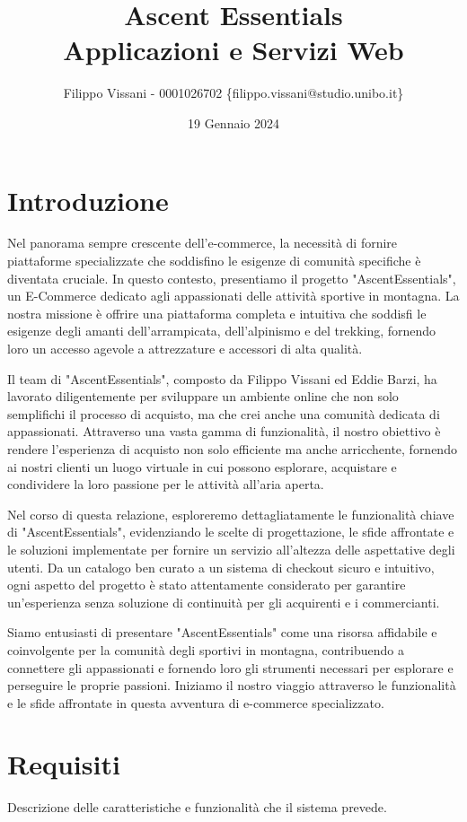 \documentclass[12pt,a4paper,openright,twoside]{book}
\title{
    Ascent Essentials \\
    \large Applicazioni e Servizi Web
}
\author{Filippo Vissani - 0001026702 \{filippo.vissani@studio.unibo.it\}}
\date{19 Gennaio 2024}
\begin{document}
\maketitle
\chapter{Introduzione}
Nel panorama sempre crescente dell'e-commerce, la necessità di fornire piattaforme specializzate che soddisfino le esigenze di comunità specifiche è diventata cruciale. In questo contesto, presentiamo il progetto "AscentEssentials", un E-Commerce dedicato agli appassionati delle attività sportive in montagna. La nostra missione è offrire una piattaforma completa e intuitiva che soddisfi le esigenze degli amanti dell'arrampicata, dell'alpinismo e del trekking, fornendo loro un accesso agevole a attrezzature e accessori di alta qualità.

Il team di "AscentEssentials", composto da Filippo Vissani ed Eddie Barzi, ha lavorato diligentemente per sviluppare un ambiente online che non solo semplifichi il processo di acquisto, ma che crei anche una comunità dedicata di appassionati. Attraverso una vasta gamma di funzionalità, il nostro obiettivo è rendere l'esperienza di acquisto non solo efficiente ma anche arricchente, fornendo ai nostri clienti un luogo virtuale in cui possono esplorare, acquistare e condividere la loro passione per le attività all'aria aperta.

Nel corso di questa relazione, esploreremo dettagliatamente le funzionalità chiave di "AscentEssentials", evidenziando le scelte di progettazione, le sfide affrontate e le soluzioni implementate per fornire un servizio all'altezza delle aspettative degli utenti. Da un catalogo ben curato a un sistema di checkout sicuro e intuitivo, ogni aspetto del progetto è stato attentamente considerato per garantire un'esperienza senza soluzione di continuità per gli acquirenti e i commercianti.

Siamo entusiasti di presentare "AscentEssentials" come una risorsa affidabile e coinvolgente per la comunità degli sportivi in montagna, contribuendo a connettere gli appassionati e fornendo loro gli strumenti necessari per esplorare e perseguire le proprie passioni. Iniziamo il nostro viaggio attraverso le funzionalità e le sfide affrontate in questa avventura di e-commerce specializzato.

\chapter{Requisiti}
Descrizione delle caratteristiche e funzionalità che il sistema prevede. 
\end{document}
